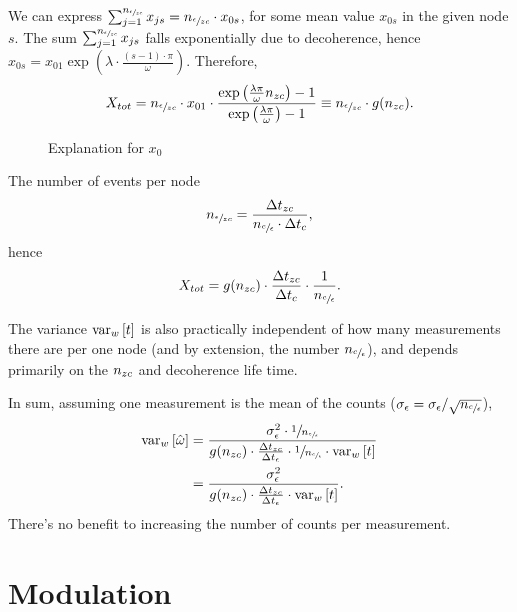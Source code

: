 \documentclass{article}
\begin{document}
We can express $\sum_{j=1}^{n_{\sfrac{\epsilon}{zc}}} x_{js} = n_{\sfrac{\epsilon}{zc}} \cdot x_{0s}$, for some mean value $x_{0s}$ in the given node $s$. The sum $\sum_{j=1}^{n_{\sfrac{\epsilon}{zc}}} x_{js}$ falls exponentially due to decoherence, hence $x_{0s} = x_{01}\exp{(\lambda\cdot \frac{(s-1)\cdot\pi}{\omega})}$. Therefore,
\[
	X_{tot} = \Nmnd\cdot x_{01} \cdot \frac{\exp{\bkt{\frac{\lambda\pi}{\omega}\Nnd}}-1}{\exp{\bkt{\frac{\lambda\pi}{\omega}}}-1} \equiv \Nmnd \cdot g(\Nnd).
\]

\begin{figure}[h]
	\centering
	\caption{Explanation for $x_0$\label{fig:x0Expl}}
\end{figure}

The number of events per node 
\[
	n_{\sfrac{\epsilon}{zc}} = \frac{\Delta t_{zc}}{n_{\sfrac{c}{\epsilon}}\cdot \Delta t_{c}},
\]
hence
\[
	X_{tot} = g(n_{zc}) \cdot \frac{\Delta t_{zc}}{\Delta t_{c}}\cdot \frac{1}{n_{\sfrac{c}{\epsilon}}}.
\]

The variance $\var[w]{t}$ is also practically independent of how many measurements there are per one node (and by extension, the number $n_{\sfrac{c}{\epsilon}}$), and depends primarily on the $n_{zc}$ and decoherence life time.

In sum, assuming one measurement is the mean of the counts ($\SD{\meas} = \SD{\meas}/\sqrt{\Ncm}$), 
\begin{align*}
	\var[w]{\hat{\omega}} &= \frac{\SD{\meas}^2\cdot \sfrac{1}{\Ncm}}{g(\Nnd)\cdot \frac{\Delta t_{zc}}{\Delta t_{\meas}}\cdot \sfrac{1}{\Ncm} \cdot \var[w]{t}} \\
		&= \frac{\SD{\meas}^2}{g(\Nnd)\cdot \frac{\Delta t_{zc}}{\Delta t_{\meas}} \cdot \var[w]{t}}.
\end{align*}
There's no benefit to increasing the number of counts per measurement.

\section{Modulation}
\end{document}
